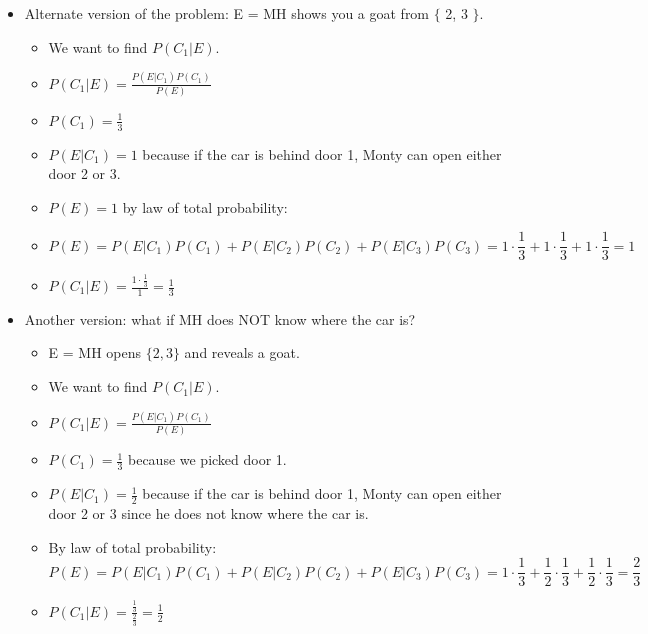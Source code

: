 \begin{itemize}
    \item Alternate version of the problem: E = MH shows you a goat from $\{$ 2, 3 $\}$.
    \begin{itemize}
        \item We want to find $P(C_1 | E)$.
        \item $P(C_1 | E) = \frac{P(E | C_1) P(C_1)}{P(E)}$
        \item $P(C_1) = \frac{1}{3}$
        \item $P(E | C_1) = 1$ because if the car is behind door 1, Monty can open either door 2 or 3.
        \item $P(E) = 1$ by law of total probability:
        \item \[ P(E) = P(E | C_1) P(C_1) + P(E | C_2) P(C_2) + P(E | C_3) P(C_3) = 1 \cdot \frac{1}{3} + 1 \cdot \frac{1}{3} + 1 \cdot \frac{1}{3} = 1 \]
        \item $P(C_1 | E) = \frac{1 \cdot \frac{1}{3}}{1} = \frac{1}{3}$
    \end{itemize}

    \item Another version: what if MH does NOT know where the car is?
    \begin{itemize}
        \item E = MH opens $\{2,3\}$ and reveals a goat.
        \item We want to find $P(C_1 | E)$.
        \item $P(C_1 | E) = \frac{P(E | C_1) P(C_1)}{P(E)}$
        \item $P(C_1) = \frac{1}{3}$ because we picked door 1.
        \item $P(E | C_1) = \frac{1}{2}$ because if the car is behind door 1, Monty can open either door 2 or 3 since he does not know where the car is.
        \item By law of total probability:
        \[ P(E) = P(E | C_1) P(C_1) + P(E | C_2) P(C_2) + P(E | C_3) P(C_3) = 1 \cdot \frac{1}{3} + \frac{1}{2} \cdot \frac{1}{3} + \frac{1}{2}\cdot \frac{1}{3} = \frac{2}{3} \]
        \item $P(C_1 | E) = \frac{\frac{1}{3}}{\frac{2}{3}} = \frac{1}{2}$
    \end{itemize}


\end{itemize}
